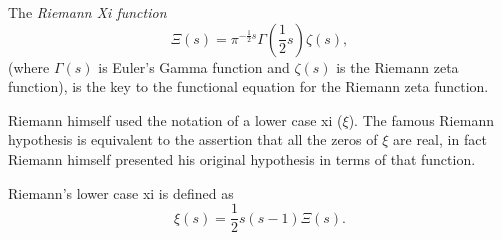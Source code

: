 \documentclass[12pt]{article}
\begin{document}
The \emph{Riemann Xi function} $$\Xi(s) = \pi^{-\frac{1}{2}s} \Gamma(\frac{1}{2}s) \zeta(s),$$ (where $\Gamma(s)$ is Euler's Gamma function and $\zeta(s)$ is the Riemann zeta function), is the key to the functional equation for the Riemann zeta function.

Riemann himself used the notation of a lower case xi ($\xi$). The famous Riemann hypothesis is equivalent to the assertion that all the zeros of $\xi$ are real, in fact Riemann himself presented his original hypothesis in terms of that function.

Riemann's lower case xi is defined as $$\xi(s) = \frac{1}{2} s(s-1) \Xi(s).$$
\end{document}
